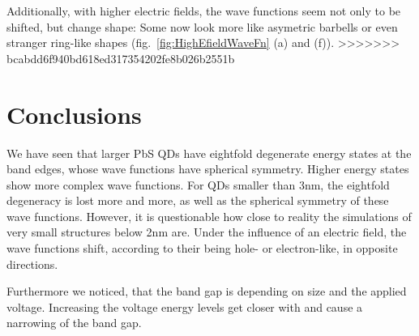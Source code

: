 Additionally, with higher electric fields, the wave functions seem not only to be shifted, but change shape: Some now look more like asymetric barbells or even stranger ring-like shapes (fig.~\ref{fig:HighEfieldWaveFn} (a) and (f)).
>>>>>>> bcabdd6f940bd618ed317354202fe8b026b2551b

\FloatBarrier

\section{Conclusions}

We have seen that larger PbS QDs have eightfold degenerate energy states at the band edges, whose wave functions have spherical symmetry. Higher energy states show more complex wave functions. For QDs smaller than 3nm, the eightfold degeneracy is lost more and more, as well as the spherical symmetry of these wave functions. However, it is questionable how close to reality the simulations of very small structures below 2nm are.
Under the influence of an electric field, the wave functions shift, according to their being hole- or electron-like, in opposite directions.

Furthermore we noticed, that the band gap is depending on size and the applied voltage. Increasing the voltage energy levels get closer with and
cause a narrowing of the band gap.
